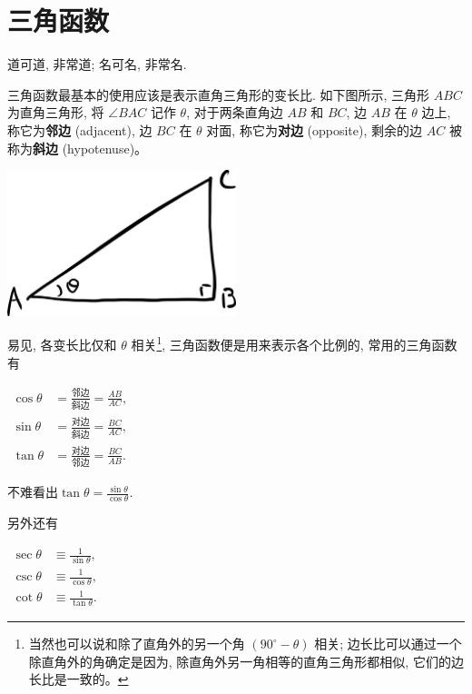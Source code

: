 \section{三角函数}\label{005}

\begin{flushright}{\kaishu 道可道, 非常道; 名可名, 非常名.}\end{flushright}

\begin{tcolorbox}[size=fbox, breakable, enhanced jigsaw, title={三角函数
(trigonometry)}]

三角函数最基本的使用应该是表示直角三角形的变长比. 如下图所示, 三角形
$ABC$ 为直角三角形, 将 $\angle BAC$ 记作 $\theta$, 对于两条直角边
$AB$ 和 $BC$, 边 $AB$ 在 $\theta$ 边上, 称它为\textbf{邻边}
(adjacent), 边 $BC$ 在 $\theta$ 对面, 称它为\textbf{对边}
(opposite), 剩余的边 $AC$ 被称为\textbf{斜边} (hypotenuse)。

\begin{tcolorbox}[size=fbox, breakable, enhanced jigsaw]
\includegraphics[width=0.5\textwidth]{img/image-20230308142717670.png}
\end{tcolorbox}

易见, 各变长比仅和 $\theta$ 相关\footnote{当然也可以说和除了直角外的另一个角
  $(90^\circ-\theta)$ 相关; 边长比可以通过一个除直角外的角确定是因为,
  除直角外另一角相等的直角三角形都相似, 它们的边长比是一致的。},
三角函数便是用来表示各个比例的, 常用的三角函数有

$\begin{aligned}\cos\theta&=\frac{\text{邻边}}{\text{斜边}}=\frac{AB}{AC},\\ \sin\theta&=\frac{\text{对边}}{\text{斜边}}=\frac{BC}{AC},\\ \tan\theta&=\frac{\text{对边}}{\text{邻边}}=\frac{BC}{AB}.\end{aligned}$

不难看出$\tan\theta=\frac{\sin\theta}{\cos\theta}$.

另外还有

$\begin{aligned}\sec\theta&\equiv\frac{1}{\sin\theta},\\ \csc\theta&\equiv\frac{1}{\cos\theta},\\ \cot\theta&\equiv\frac{1}{\tan\theta}.\end{aligned}$


\end{tcolorbox}
